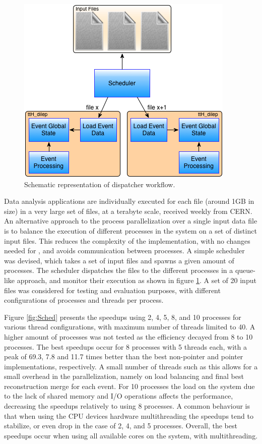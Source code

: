 \begin{figure}[!htp]
	\begin{center}
		\includegraphics[scale=0.5]{images/scheduler_workflow.png}
		\caption{Schematic representation of dispatcher workflow.}
		\label{fig:sched_flow}
	\end{center}
\end{figure}

Data analysis applications are individually executed for each file (around 1GB in size) in a very large set of files, at a terabyte scale, received weekly from CERN. An alternative approach to the process parallelization over a single input data file is to balance the execution of different \tth processes in the system on a set of distinct input files. This reduces the complexity of the implementation, with no changes needed for \tth, and avoids communication between processes. A simple scheduler was devised, which takes a set of input files and spawns a given amount of \tth processes. The scheduler dispatches the files to the different processes in a queue-like approach, and monitor their execution as shown in figure \ref{fig:sched_flow}. A set of 20 input files was considered for testing and evaluation purposes, with different configurations of processes and threads per process.

Figure \ref{fig:Sched} presents the speedups using 2, 4, 5, 8, and 10 processes for various thread configurations, with maximum number of threads limited to 40. A higher amount of processes was not tested as the efficiency decayed from 8 to 10 processes. The best speedups occur for 8 processes with 5 threads each, with a peak of 69.3, 7.8 and 11.7 times better than the best non-pointer and pointer implementations, respectively. A small number of threads such as this allows for a small overhead in the \tth parallelization, namely on load balancing and final best reconstruction merge for each event. For 10 processes the load on the system due to the lack of shared memory and I/O operations affects the performance, decreasing the speedups relatively to using 8 processes. A common behaviour is that when using the CPU devices hardware multithreading the speedups tend to stabilize, or even drop in the case of 2, 4, and 5 processes. Overall, the best speedups occur when using all available cores on the system, with multithreading.


